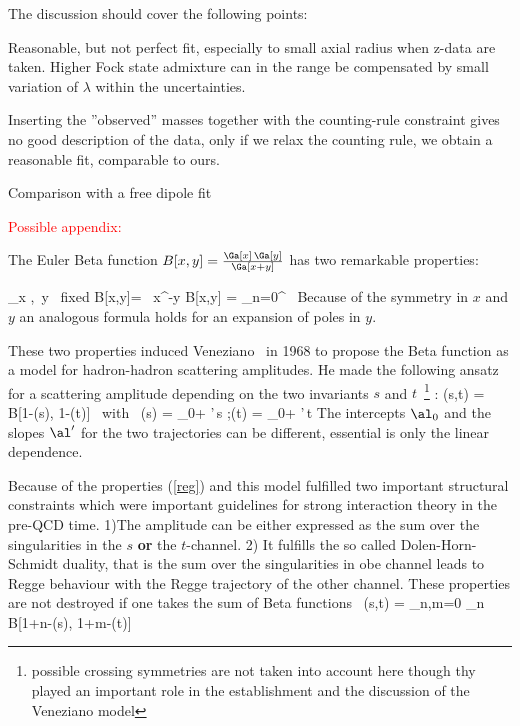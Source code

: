 The discussion should cover the following points:

Reasonable, but not perfect fit, especially to small axial radius
when z-data are taken. Higher Fock state admixture can in the
range  be compensated by small variation of $\lambda$ within the
uncertainties.

Inserting the ''observed'' masses together with the counting-rule
constraint gives no good description of the data, only if we relax
the counting rule, we obtain a reasonable fit, comparable to ours.

Comparison with a free dipole fit


\textcolor{red}{Possible appendix:}

The Euler Beta function $B[x,y]= \frac{\Ga[x]\,\Ga[y]}{\Ga[x+y]}$
has two remarkable properties:

\beq {} \lim_{x \to \infty,\, y \, \rm{fixed}} B[x,y]=
\Ga[y]\, x^{-y} \enq \beq {} B[x,y] = \sum_{n=0}^\infty
{} \frac{\Ga[y]}{\Ga[y-n]}\,  \enq
Because of the symmetry in $x$ and $y$ an analogous formula holds
for an expansion of poles in $y$.


These two properties induced Veneziano~\cite{Veneziano:1968yb} in
1968 to propose the Beta function as a model for hadron-hadron
scattering amplitudes. He made the following ansatz for a
scattering amplitude depending on the two invariants $s$ and
$t$~\footnote{possible crossing symmetries are not taken into
account here though thy played an important role in the
establishment and the discussion of the Veneziano model}  : \beq
{} \cT(s,t) = \be B[1-\al(s), 1-\al(t)] \; \mbox{ with } \;
\al(s) = \al_{0}+ \al'\,s ;\;\al(t) = \al_{0}+ \al'\,t \enq The
intercepts $\al_0$ and the slopes $\al'$ for the two trajectories
can be different, essential is only the linear dependence.

Because of the properties (\ref{reg}) and  this model
fulfilled two important structural constraints which were
important guidelines for strong interaction theory in the pre-QCD
time. 1)The amplitude can be either expressed as the sum over the
singularities in the $s$ {\bf or} the $t$-channel. 2) It fulfills
the so called Dolen-Horn-Schmidt duality, that is the sum over the
singularities in obe channel leads to Regge behaviour with the
Regge trajectory of the other channel. These properties are not
destroyed if one takes the sum of Beta
functions~\cite{Veneziano:1968yb} \beq {} \cT(s,t) =
\sum_{n,m=0} \be_n  B[1+n-\al(s), 1+m-\al(t)] \; \enq

